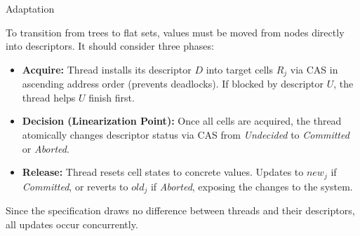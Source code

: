 \begin{frame}{Adaptation}

To transition from trees to flat sets, values must be moved from nodes directly into descriptors. It should consider three phases:

\begin{itemize}
    \item \textbf{Acquire:} Thread installs its descriptor $D$ into target cells $R_j$ via CAS in ascending address order (prevents deadlocks). If blocked by descriptor $U$, the thread helps $U$ finish first.


    \pause

    \item \textbf{Decision (Linearization Point):} Once all cells are acquired, the thread atomically changes descriptor status via CAS from \textit{Undecided} to \textit{Committed} or \textit{Aborted}.

    \pause

    \item \textbf{Release:} Thread resets cell states to concrete values. Updates to $new_j$ if \textit{Committed}, or reverts to $old_j$ if \textit{Aborted}, exposing the changes to the system.
\end{itemize}

\pause

Since the specification draws no difference between threads and their descriptors, all updates occur concurrently.


\end{frame}


